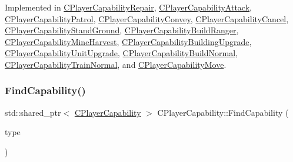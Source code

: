 Implemented in \hyperlink{classCPlayerCapabilityRepair_a579761cab74d447b95856a24a7841b2e}{C\+Player\+Capability\+Repair}, \hyperlink{classCPlayerCapabilityAttack_ab1cda67a8e637a90accf03d1581d4072}{C\+Player\+Capability\+Attack}, \hyperlink{classCPlayerCapabilityPatrol_a48e60ecd544759f3aad66afeb4a6e0a9}{C\+Player\+Capability\+Patrol}, \hyperlink{classCPlayerCapabilityConvey_a6c5ebd62a9c3a619c56e070aca5443a7}{C\+Player\+Capability\+Convey}, \hyperlink{classCPlayerCapabilityCancel_a8b4ad4a4983b01e458d439cf68fd2ba9}{C\+Player\+Capability\+Cancel}, \hyperlink{classCPlayerCapabilityStandGround_a5567bfa47166f4080bd2b86f5c33e29c}{C\+Player\+Capability\+Stand\+Ground}, \hyperlink{classCPlayerCapabilityBuildRanger_ad8b45a3ffc7ee82d5550cc690823d82c}{C\+Player\+Capability\+Build\+Ranger}, \hyperlink{classCPlayerCapabilityMineHarvest_a37944eb249559f1246348b47e3f24dee}{C\+Player\+Capability\+Mine\+Harvest}, \hyperlink{classCPlayerCapabilityBuildingUpgrade_af515cec6f1a28607864c853307e17d7c}{C\+Player\+Capability\+Building\+Upgrade}, \hyperlink{classCPlayerCapabilityUnitUpgrade_ad01fc5df598efea4063ac2bbf0ba34e9}{C\+Player\+Capability\+Unit\+Upgrade}, \hyperlink{classCPlayerCapabilityBuildNormal_a5487e5521779846198604e8ebadaf283}{C\+Player\+Capability\+Build\+Normal}, \hyperlink{classCPlayerCapabilityTrainNormal_ac49cf646b94220844a03b7c3a8a7f215}{C\+Player\+Capability\+Train\+Normal}, and \hyperlink{classCPlayerCapabilityMove_aef25bc0d224e993c46f5cd4cd6b8b7c8}{C\+Player\+Capability\+Move}.

\hypertarget{classCPlayerCapability_a881ba4b87385d7cfe5cb6ced2d26f226}{}\label{classCPlayerCapability_a881ba4b87385d7cfe5cb6ced2d26f226} 
\subsubsection{\texorpdfstring{Find\+Capability()}{FindCapability()}\hspace{0.1cm}{\footnotesize\ttfamily [1/2]}}
{\footnotesize\ttfamily std\+::shared\+\_\+ptr$<$ \hyperlink{classCPlayerCapability}{C\+Player\+Capability} $>$ C\+Player\+Capability\+::\+Find\+Capability (\begin{DoxyParamCaption}\item[{\hyperlink{GameDataTypes_8h_a35b98ce26aca678b03c6f9f76e4778ce}{E\+Asset\+Capability\+Type}}]{type }\end{DoxyParamCaption})\hspace{0.3cm}{\ttfamily [static]}}



